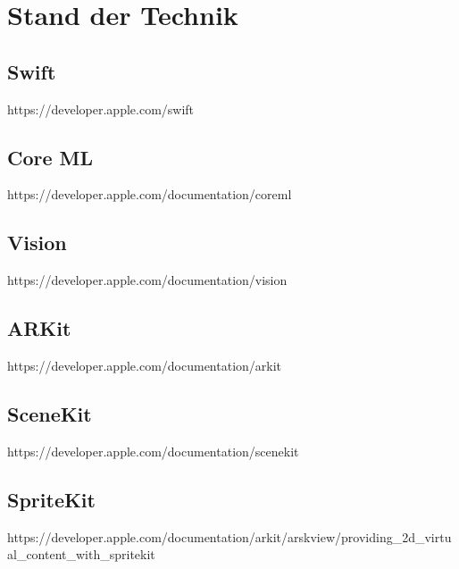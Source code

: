 \section{Stand der Technik}

\subsection{Swift}
https://developer.apple.com/swift

\subsection{Core ML}
https://developer.apple.com/documentation/coreml

\subsection{Vision}
https://developer.apple.com/documentation/vision

\subsection{ARKit}
https://developer.apple.com/documentation/arkit

\subsection{SceneKit}
https://developer.apple.com/documentation/scenekit

\subsection{SpriteKit}
https://developer.apple.com/documentation/arkit/arskview/providing\_2d\_virtual\_content\_with\_spritekit